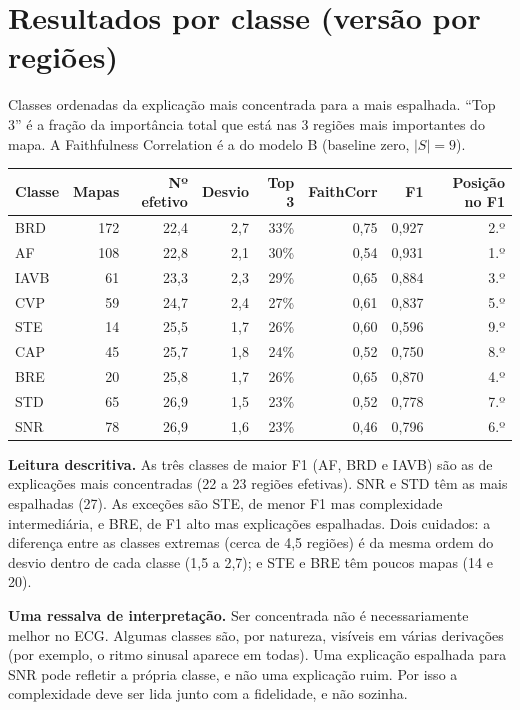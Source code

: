 \documentclass[11pt,a4paper]{article}
\begin{document}
\section{Resultados por classe (versão por regiões)}
Classes ordenadas da explicação mais concentrada para a mais espalhada. “Top 3” é a fração da importância total que está nas 3 regiões mais importantes do mapa. A Faithfulness Correlation é a do modelo B (baseline zero, $|S| = 9$).
\begin{center}\small
\begin{tabularx}{\linewidth}{Xrrrrrrr}
\toprule
\textbf{Classe} & \textbf{Mapas} & \textbf{Nº efetivo} & \textbf{Desvio} & \textbf{Top 3} & \textbf{FaithCorr} & \textbf{F1} & \textbf{Posição no F1} \\
\midrule
BRD  & 172 & 22,4 & 2,7 & 33\% & 0,75 & 0,927 & 2.º \\
AF   & 108 & 22,8 & 2,1 & 30\% & 0,54 & 0,931 & 1.º \\
IAVB &  61 & 23,3 & 2,3 & 29\% & 0,65 & 0,884 & 3.º \\
CVP  &  59 & 24,7 & 2,4 & 27\% & 0,61 & 0,837 & 5.º \\
STE  &  14 & 25,5 & 1,7 & 26\% & 0,60 & 0,596 & 9.º \\
CAP  &  45 & 25,7 & 1,8 & 24\% & 0,52 & 0,750 & 8.º \\
BRE  &  20 & 25,8 & 1,7 & 26\% & 0,65 & 0,870 & 4.º \\
STD  &  65 & 26,9 & 1,5 & 23\% & 0,52 & 0,778 & 7.º \\
SNR  &  78 & 26,9 & 1,6 & 23\% & 0,46 & 0,796 & 6.º \\
\bottomrule
\end{tabularx}
\end{center}

\textbf{Leitura descritiva.} As três classes de maior F1 (AF, BRD e IAVB) são as de explicações mais concentradas (22 a 23 regiões efetivas). SNR e STD têm as mais espalhadas (27). As exceções são STE, de menor F1 mas complexidade intermediária, e BRE, de F1 alto mas explicações espalhadas. Dois cuidados: a diferença entre as classes extremas (cerca de 4,5 regiões) é da mesma ordem do desvio dentro de cada classe (1,5 a 2,7); e STE e BRE têm poucos mapas (14 e 20).

\textbf{Uma ressalva de interpretação.} Ser concentrada não é necessariamente melhor no ECG. Algumas classes são, por natureza, visíveis em várias derivações (por exemplo, o ritmo sinusal aparece em todas). Uma explicação espalhada para SNR pode refletir a própria classe, e não uma explicação ruim. Por isso a complexidade deve ser lida junto com a fidelidade, e não sozinha.
\end{document}
